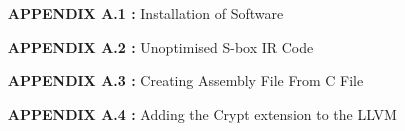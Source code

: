 \singlespacing


\begin{itemize}[leftmargin=3.3cm,itemsep=-0.4em,labelsep=1.5mm] %
\item [\textbf{APPENDIX A.1 :}]Installation of Software
\item [\textbf{APPENDIX A.2 :}]Unoptimised S-box IR Code
\item [\textbf{APPENDIX A.3 :}]Creating Assembly File From C File
\item [\textbf{APPENDIX A.4 :}]Adding the Crypt extension to the LLVM
\end{itemize}

\newpage